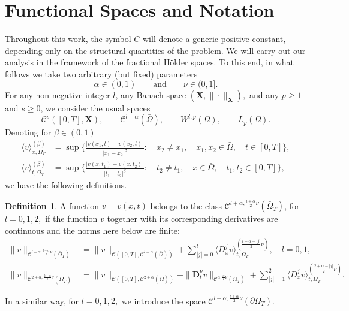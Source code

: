 \documentclass[reqno]{amsart}
\def\C {\mathcal{C}}
\theoremstyle{definition}
\newtheorem{definition}[proposition]{Definition}
\numberwithin{equation}{section}
\begin{document}
\section{Functional Spaces and Notation}
\label{s2}

\noindent
Throughout this work, the symbol $C$ will denote a generic positive constant, depending only on the structural quantities of the problem. We will carry out our analysis in the framework of the fractional H\"{o}lder spaces. To this end, in what follows we take two arbitrary (but fixed) parameters
\[
\alpha\in(0,1) \qquad\text{and}\qquad \nu\in(0,1].
\]
For any non-negative integer $l$, any Banach space $(\mathbf{X},\|\cdot\|_{\mathbf{X}}),$ and any $p\geq 1$ and $s\geq 0$,  we consider the usual spaces
\[
\C^{s}([0,T],\mathbf{X}),\qquad\C^{l+\alpha}(\bar{\Omega}),
\qquad W^{l,p}(\Omega),\qquad L_{p}(\Omega).
\]
Denoting for $\beta\in(0,1)$
\begin{align*}
\langle v\rangle^{(\beta)}_{x,\Omega_T}&=\sup\Big\{\frac{|v(x_1,t)-v(x_2,t)|}{|x_1-x_2|^{\beta}}:\quad x_{2}\neq x_{1},\quad x_1,x_2\in\bar{\Omega}, \quad t\in[0,T]\Big\},\\
\langle v\rangle^{(\beta)}_{t,\Omega_T}&=\sup\Big\{\frac{|v(x,t_1)-v(x,t_2)|}{|t_1-t_2|^{\beta}}:\quad t_{2}\neq t_{1},\quad x\in\bar{\Omega}, \quad t_1,t_2\in[0,T]\Big\},
\end{align*}
we have the following definitions.
\begin{definition}\label{d2.1}
 A function $v=v(x,t)$ belongs to the class $\C^{l+\alpha,\frac{l+\alpha}{2}\nu}(\bar{\Omega}_{T})$, for $l=0,1,2,$ if the function $v$ together with its corresponding derivatives are continuous and the norms here below are finite:
\begin{align*}
\|v\|_{\C^{l+\alpha,\frac{l+\alpha}{2}\nu}(\bar{\Omega}_{T})} &=
\|v\|_{\C([0,T],
\C^{l+\alpha}(\bar{\Omega}))}+\sum_{|j|=0}^{l}\langle
D_{x}^{j}v\rangle^{(\frac{l+\alpha-|j|}{2}\nu)}_{t,{\Omega}_{T}},
\quad
l=0,1,\\
\|v\|_{\C^{2+\alpha,\frac{2+\alpha}{2}\nu}(\bar{\Omega}_{T})}
&=\|v\|_{\C([0,T],
\C^{2+\alpha}(\bar{\Omega}))}+\|\mathbf{D}_{t}^{\nu}v\|_{\C^{\alpha,\frac{\alpha}{2}\nu}
(\bar{\Omega}_{T})}+\sum_{|j|=1}^{2}\langle
D_{x}^{j}v\rangle^{(\frac{2+\alpha-|j|}{2}\nu)}_{t,{\Omega}_{T}}.
\end{align*}
\end{definition}
In a similar way, for $l=0,1,2,$ we introduce the space $\C^{l+\alpha,\frac{l+\alpha}{2}\nu}(\partial\Omega_{T})$.
\end{document}
